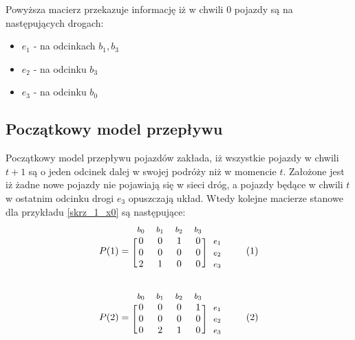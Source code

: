 \documentclass[12pt]{book}
\newcommand\addtag{\refstepcounter{equation}
\tag{\theequation}}
\begin{document}
Powyższa macierz przekazuje informację iż w chwili $0$ pojazdy są na następujących drogach:
\begin{itemize}
\item $e_1$ - na odcinkach $b_1,b_3$ 
\item $e_2$ - na odcinku $b_3$ 
\item $e_3$ - na odcinku $b_0$ 
\end{itemize}
\subsection{Początkowy model przepływu}
Początkowy model przepływu pojazdów zakłada, iż wszystkie pojazdy w chwili $t+1$ są o jeden odcinek dalej w swojej podróży niż w momencie $t$. Założone jest iż żadne nowe pojazdy nie pojawiają się w sieci dróg, a pojazdy będące w chwili $t$ w ostatnim odcinku drogi $e_3$ opuszczają układ. Wtedy kolejne macierze stanowe dla przykładu \ref{skrz_1_x0} są następujące:
\begin{equation*}
  P(1)=
  \begin{blockarray}{*{4}{c} l}
    \begin{block}{*{4}{>{$\footnotesize}c<{$}} l}
      $b_0$ & $b_1$  & $b_2$ & $b_3$ \\
    \end{block}
    \begin{block}{[*{4}{c}]>{$\footnotesize}l<{$}}
       0 & 0 & 1 & 0 & $e_1$ \\
       0 & 0 & 0 & 0 & $e_2$ \\
       2 & 1 & 0 & 0 & $e_3$ \\
    \end{block}
  \end{blockarray} \addtag
\end{equation*}

\begin{equation*}
  P(2)=
  \begin{blockarray}{*{4}{c} l}
    \begin{block}{*{4}{>{$\footnotesize}c<{$}} l}
      $b_0$ & $b_1$ & $b_2$ & $b_3$  \\
    \end{block}
    \begin{block}{[*{4}{c}]>{$\footnotesize}l<{$}}
       0 & 0 & 0 & 1 & $e_1$ \\
       0 & 0 & 0 & 0 & $e_2$ \\
       0 & 2 & 1 & 0 & $e_3$ \\
    \end{block}
  \end{blockarray} \addtag
\end{equation*}
\end{document}
